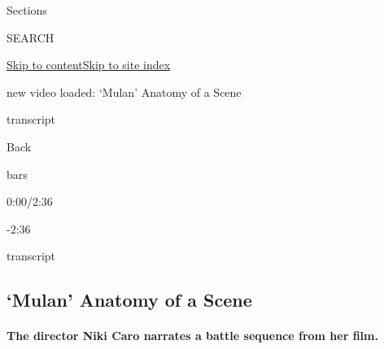 Sections

SEARCH

\protect\hyperlink{site-content}{Skip to
content}\protect\hyperlink{site-index}{Skip to site index}

new video loaded: `Mulan' \textbar{} Anatomy of a Scene

transcript

Back

bars

0:00/2:36

-2:36

transcript

\hypertarget{mulan--anatomy-of-a-scene}{%
\subsection{`Mulan' \textbar{} Anatomy of a
Scene}\label{mulan--anatomy-of-a-scene}}

\hypertarget{the-director-niki-caro-narrates-a-battle-sequence-from-her-film}{%
\paragraph{The director Niki Caro narrates a battle sequence from her
film.}\label{the-director-niki-caro-narrates-a-battle-sequence-from-her-film}}

